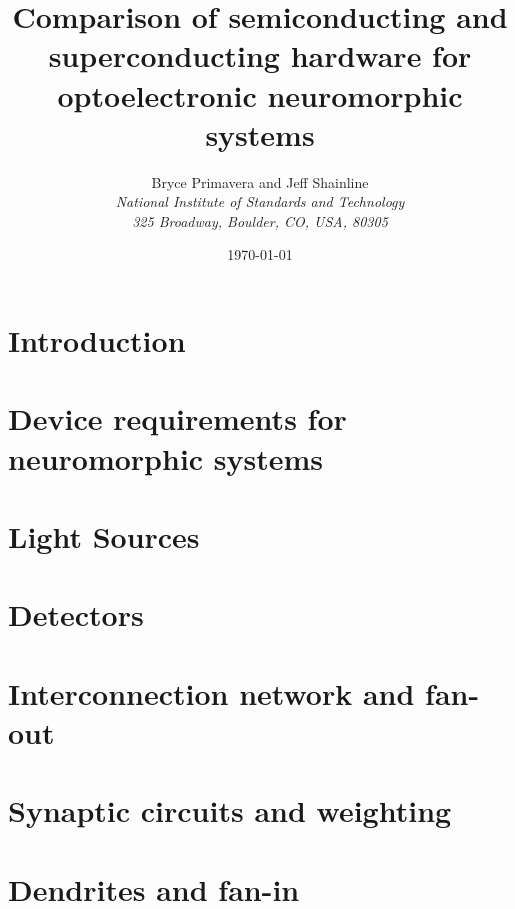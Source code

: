 \documentclass[twocolumn]{article}
\title{Comparison of semiconducting and superconducting hardware for optoelectronic neuromorphic systems}
\author[1]{\Large{Bryce Primavera and Jeff Shainline}
\\
\textit{\large{National Institute of Standards and Technology}}
\\
\vspace{-0.2em}
\textit{\large{325 Broadway, Boulder, CO, USA, 80305}}
\\
}
\date{\today}%
\begin{document}
\twocolumn[
  \begin{@twocolumnfalse}
    \maketitle
    \begin{abstract}

    \vspace{3em}
    \end{abstract}
  \end{@twocolumnfalse}
]


	
\setcounter{tocdepth}{3}
\setcounter{secnumdepth}{4}
\tableofcontents	
	
\section{\label{sec:introduction}Introduction}

\section{\label{sec:neural_device_requirements}Device requirements for neuromorphic systems}
	
\section{\label{sec:light_sources}Light Sources}
	
\section{\label{sec:detectors}Detectors}

\section{\label{sec:interconnection}Interconnection network and fan-out}

\section{\label{sec:synapses}Synaptic circuits and weighting}

\section{\label{sec:dendrites}Dendrites and fan-in}
\end{document}

